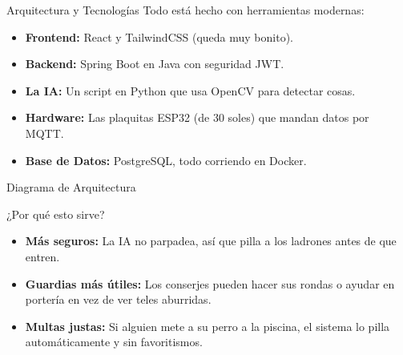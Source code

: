 \documentclass[aspectratio=169]{beamer}
\begin{document}
\begin{frame}{Arquitectura y Tecnologías}
Todo está hecho con herramientas modernas:
\begin{itemize}
    \item \textbf{Frontend:} React y TailwindCSS (queda muy bonito).
    \item \textbf{Backend:} Spring Boot en Java con seguridad JWT.
    \item \textbf{La IA:} Un script en Python que usa OpenCV para detectar cosas.
    \item \textbf{Hardware:} Las plaquitas ESP32 (de 30 soles) que mandan datos por MQTT.
    \item \textbf{Base de Datos:} PostgreSQL, todo corriendo en Docker.
\end{itemize}
\end{frame}

\begin{frame}{Diagrama de Arquitectura}
\begin{center}
\end{center}
\end{frame}

\begin{frame}{¿Por qué esto sirve?}
\begin{itemize}
    \item \textbf{Más seguros:} La IA no parpadea, así que pilla a los ladrones antes de que entren.
    \item \textbf{Guardias más útiles:} Los conserjes pueden hacer sus rondas o ayudar en portería en vez de ver teles aburridas.
    \item \textbf{Multas justas:} Si alguien mete a su perro a la piscina, el sistema lo pilla automáticamente y sin favoritismos.
\end{itemize}
\end{frame}
\end{document}
